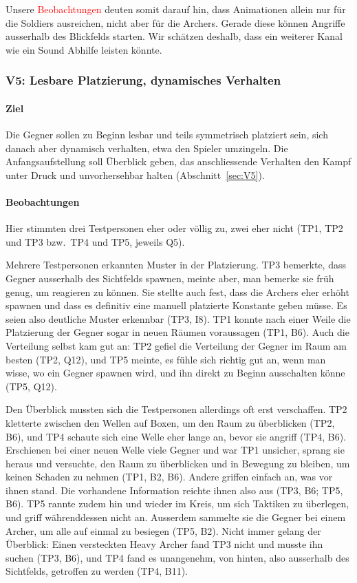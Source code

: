 \documentclass[../Main.tex]{subfiles}
\begin{document}
Unsere \textcolor{red}{Beobachtungen} deuten somit darauf hin, dass Animationen allein nur für die Soldiers ausreichen, nicht aber für die Archers. Gerade diese können Angriffe ausserhalb des Blickfelds starten. Wir schätzen deshalb, dass ein weiterer Kanal wie ein Sound Abhilfe leisten könnte.

\subsubsection{V5: Lesbare Platzierung, dynamisches Verhalten}

\paragraph{Ziel}
Die Gegner sollen zu Beginn lesbar und teils symmetrisch platziert sein, sich danach aber dynamisch verhalten, etwa den Spieler umzingeln. Die Anfangsaufstellung soll Überblick geben, das anschliessende Verhalten den Kampf unter Druck und unvorhersehbar halten (Abschnitt~\ref{sec:V5}).

\paragraph{Beobachtungen}
Hier stimmten drei Testpersonen eher oder völlig zu, zwei eher nicht (TP1, TP2 und TP3 bzw.\ TP4 und TP5, jeweils Q5).

Mehrere Testpersonen erkannten Muster in der Platzierung. TP3 bemerkte, dass Gegner ausserhalb des Sichtfelds spawnen, meinte aber, man bemerke sie früh genug, um reagieren zu können. Sie stellte auch fest, dass die Archers eher erhöht spawnen und dass es definitiv eine manuell platzierte Konstante geben müsse. Es seien also deutliche Muster erkennbar (TP3, I8). TP1 konnte nach einer Weile die Platzierung der Gegner sogar in neuen Räumen voraussagen (TP1, B6). Auch die Verteilung selbst kam gut an: TP2 gefiel die Verteilung der Gegner im Raum am besten (TP2, Q12), und TP5 meinte, es fühle sich richtig gut an, wenn man wisse, wo ein Gegner spawnen wird, und ihn direkt zu Beginn ausschalten könne (TP5, Q12).

Den Überblick mussten sich die Testpersonen allerdings oft erst verschaffen. TP2 kletterte zwischen den Wellen auf Boxen, um den Raum zu überblicken (TP2, B6), und TP4 schaute sich eine Welle eher lange an, bevor sie angriff (TP4, B6). Erschienen bei einer neuen Welle viele Gegner und war TP1 unsicher, sprang sie heraus und versuchte, den Raum zu überblicken und in Bewegung zu bleiben, um keinen Schaden zu nehmen (TP1, B2, B6). Andere griffen einfach an, was vor ihnen stand. Die vorhandene Information reichte ihnen also aus (TP3, B6; TP5, B6). TP5 rannte zudem hin und wieder im Kreis, um sich Taktiken zu überlegen, und griff währenddessen nicht an. Ausserdem sammelte sie die Gegner bei einem Archer, um alle auf einmal zu besiegen (TP5, B2). Nicht immer gelang der Überblick: Einen versteckten Heavy Archer fand TP3 nicht und musste ihn suchen (TP3, B6), und TP4 fand es unangenehm, von hinten, also ausserhalb des Sichtfelds, getroffen zu werden (TP4, B11).
\end{document}
